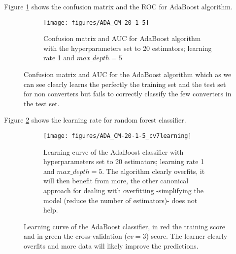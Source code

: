 \documentclass[11pt]{article}
\begin{document}
Figure \ref{fig:rf_ada} shows the confusion matrix and the ROC for AdaBoost algorithm. 
\begin{figure}[H]
    \centering
    \begin{subfigure}[t]{.8\textwidth}
        \centering
        \texttt{[image: figures/ADA\_CM-20-1-5]}
        \caption{Confusion matrix and AUC for AdaBoost algorithm with the hyperparameters set to 20 estimators; learning rate 1 and  $max\_depth=5$}
    \end{subfigure}

    \label{fig:rf_ada}
    \caption{Confusion matrix and AUC for the AdaBoost algorithm which as we can see clearly learns the perfectly the training set and the test set for non converters but fails to correctly classify the few converters in the test set. }
\end{figure}

Figure \ref{fig:rf_learning} shows the learning rate for random forest classifier. 
\begin{figure}[H]
    \centering
    \begin{subfigure}[t]{.8\textwidth}
        \centering
        \texttt{[image: figures/ADA\_CM-20-1-5\_cv7learning]}
        \caption{Learning curve of the AdaBoost classifier with  hyperparameters set to 20 estimators; learning rate 1 and  $max\_depth=5$. The algorithm clearly overfits, it will then benefit from more, the other canonical approach for dealing with overfitting -simplifying the model (reduce the number of estimators)- does not help.}
    \end{subfigure}

    \label{fig:rf_learning}
    \caption{Learning curve of the AdaBoost classifier, in red the training score and in green the cross-validation ($cv=3$) score. The learner clearly overfits and more data will likely improve the predictions.}
\end{figure}

%
\end{document}

